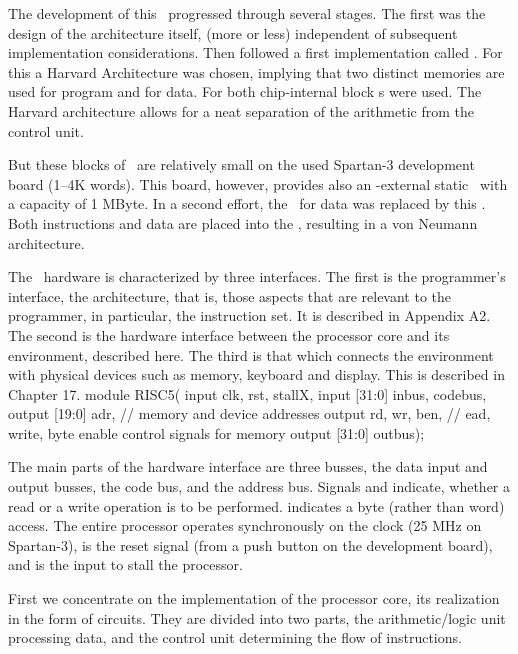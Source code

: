 The development of this \RISC\ progressed through several stages. The first was the design of the architecture itself, (more or less) independent of subsequent implementation considerations. Then followed a first implementation called . For this a Harvard Architecture was chosen, implying that two distinct memories are used for program and for data. For both chip-internal block \RAM{}s were used. The Harvard architecture allows for a neat separation of the arithmetic from the control unit.

But these blocks of \RAM\ are relatively small on the used Spartan-3 development board (1--4K words). This board, however, provides also an \FPGA-external static \RAM\ with a capacity of 1 MByte. In a second effort, the \BRAM\ for data was replaced by this \SRAM. Both instructions and data are placed into the \SRAM, resulting in a von Neumann architecture.

The \RISC\ hardware is characterized by three interfaces. The first is the programmer's interface, the architecture, that is, those aspects that are relevant to the programmer, in particular, the instruction set. It is described in Appendix A2. The second is the hardware interface between the processor core and its environment, described here. The third is that which connects the environment with physical devices such as memory, keyboard and display. This is described in Chapter 17.
\begintt
module RISC5(
  input clk, rst, stallX,
  input [31:0] inbus, codebus,
  output [19:0] adr,            // memory and device addresses
  output rd, wr, ben,           // ead, write, byte enable control signals for memory
  output [31:0] outbus);
\endtt

The main parts of the hardware interface are three busses, the data input and output busses, the code bus, and the address bus. Signals  and  indicate, whether a read or a write operation is to be performed.  indicates a byte (rather than word) access. The entire processor operates synchronously on the clock  (25 MHz on Spartan-3),  is the reset signal (from a push button on the development board), and  is the input to stall the processor.


First we concentrate on the implementation of the processor core, its realization in the form of circuits. They are divided into two parts, the arithmetic/logic unit processing data, and the control unit determining the flow of instructions.

